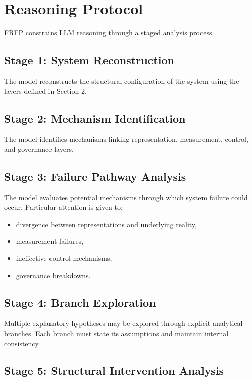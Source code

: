 \section{Reasoning Protocol}

FRFP constrains LLM reasoning through a staged analysis process.

\subsection{Stage 1: System Reconstruction}

The model reconstructs the structural configuration of the system using the layers defined in Section 2.

\subsection{Stage 2: Mechanism Identification}

The model identifies mechanisms linking representation, measurement, control, and governance layers.

\subsection{Stage 3: Failure Pathway Analysis}

The model evaluates potential mechanisms through which system failure could occur. Particular attention is given to:

\begin{itemize}
\item divergence between representations and underlying reality,
\item measurement failures,
\item ineffective control mechanisms,
\item governance breakdowns.
\end{itemize}

\subsection{Stage 4: Branch Exploration}

Multiple explanatory hypotheses may be explored through explicit analytical branches. Each branch must state its assumptions and maintain internal consistency.

\subsection{Stage 5: Structural Intervention Analysis}

